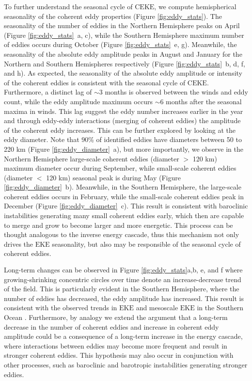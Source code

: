 \documentclass[draft,linenumbers]{agujournal2019}
\newcommand{\EKE}{\textrm{EKE}}
\newcommand{\CEKE}{\textrm{CEKE}}
\begin{document}
	To further understand the seasonal cycle of $\CEKE$, we compute hemispherical seasonality of the coherent eddy properties (Figure \ref{fig:eddy_stats}). 
	The seasonality of the number of eddies in the Northern Hemisphere peaks on April (Figure \ref{fig:eddy_stats}~a, c), while the Southern Hemisphere maximum number of eddies occurs during October (Figure \ref{fig:eddy_stats}~e, g). 
	Meanwhile, the seasonality of the absolute eddy amplitude peaks in August and January for the Northern and Southern Hemispheres respectively (Figure \ref{fig:eddy_stats}~b, d, f, and h). 
	As expected, the seasonality of the absolute eddy amplitude or intensity of the coherent eddies is consistent with the seasonal cycle of $\CEKE$. 
	Furthermore, a distinct lag of $\sim$3 months is observed between the winds and eddy count, while the eddy amplitude maximum occurs $\sim$6 months after the seasonal maxima in winds. 
	This lag suggest the eddy number increases earlier in the year and through eddy-eddy interactions (merging of coherent eddies) the amplitude of the coherent eddy increases. This can be further explored by looking at the eddy diameter. Note that 90\% of identified eddies have diameters between 50 to 220 km (Figure \ref{fig:eddy_diameter}~a), but more importantly, we observe in the Northern Hemisphere large-scale coherent eddies (diameter $>$ 120 km) maximum diameter occur during September, while small-scale coherent eddies (diameter $<$ 120 km) seasonal peak is during May (Figure \ref{fig:eddy_diameter}~b). Meanwhile, in the Southern Hemisphere, the large-scale coherent eddies occurs in February, while the small-scale coherent eddies peak in December (Figure \ref{fig:eddy_diameter}~c). This result is consistent with baroclinic instabilities generating many small coherent eddies early, which then are capable to merge and grow to become larger and more energetic. This process can be thought analogous to the inverse energy cascade, thus this mechanism not only drives the $\EKE$ seasonality, but also may be responsible of the seasonal cycle of coherent eddies. 

	Long-term changes can be observed in Figure \ref{fig:eddy_stats}a,b, e, and f where growing-shrinking concentric circles over time denote an increase-decrease trend of the field. 
	This is particularly evident in the Southern Hemisphere, where the number of eddies has decreased, the eddy amplitude has increased. 
	This result is consistent with the observed trends in $\EKE$ and mesoscale $\EKE$ in the Southern Ocean \citep{Hogg_Recent_2015,Martinez_Kinetic_2021}. 
	Furthermore, by analogy we extend the argument that a long-term decrease in the number of coherent eddies and increase in coherent eddy amplitude could be a consequence of a long-term increase in the energy cascade, where interactions between eddies may become more frequent and result in stronger coherent eddies. This hypothesis may also occur in conjunction with other processes, such as baroclinic and barotropic instabilities generating stronger eddies. 
\end{document}
